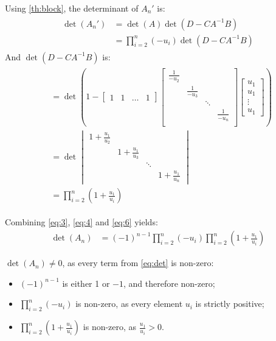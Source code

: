 Using \autoref{th:block}, the determinant of $A_n'$ is:
\begin{align} \label{eq:4}
\begin{split}
\det(A_n') &= \det(A) \det(D - C A^{-1} B) \\
& = \prod_{i=2}^n (-u_i) \det(D - CA^{-1}B)
\end{split}
\end{align}
And $\det(D - CA^{-1}B)$ is:
\begin{align} \label{eq:6}
\begin{split}
  &= \det(1 - \begin{bmatrix}1 & 1 & \dots & 1\end{bmatrix} \begin{bmatrix}
      \frac{1}{-u_2} \\
      & \frac{1}{-u_3} \\
      & & \ddots \\
      & & & \frac{1}{-u_n}\\
  \end{bmatrix}
  \begin{bmatrix}u_1 \\ u_1 \\ \vdots \\ u_1\end{bmatrix}) \\
  &= \det\begin{vmatrix}
      1 + \frac{u_1}{u_2} \\
      & 1 + \frac{u_1}{u_3} \\
      & & \ddots \\
      & & & 1 + \frac{u_1}{u_n}
  \end{vmatrix} \\
  & = \prod_{i=2}^n(1+\frac{u_1}{u_i})
\end{split}
\end{align}

Combining \autoref{eq:3}, \autoref{eq:4} and \autoref{eq:6} yields:
\begin{align} \label{eq:det}
    \det(A_n) &= (-1)^{n-1} \prod_{i=2}^n (-u_i) \prod_{i=2}^n (1 + \frac{u_1}{u_i})
\end{align}

$\det(A_n) \neq 0$, as every term from \autoref{eq:det} is non-zero:
\begin{itemize}
    \item $(-1)^{n-1}$ is either 1 or $-1$, and therefore non-zero;
    \item $\prod_{i=2}^n (-u_i)$ is non-zero, as every element $u_i$ is strictly positive;
    \item $\prod_{i=2}^n (1 + \frac{u_1}{u_i})$ is non-zero, as $\frac{u_1}{u_i} > 0$.
\end{itemize}